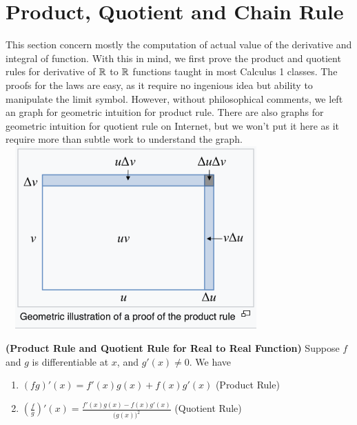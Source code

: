 \documentclass{report}
\begin{document}
\section{Product, Quotient and Chain Rule}
\begin{mdframed}
This section concern mostly the computation of actual value of the derivative and integral of function. With this in mind, we first prove the product and quotient rules for derivative of $\mathbb{R}$ to  $\mathbb{R}$ functions taught in most Calculus 1 classes. The proofs for the laws are easy, as it require no ingenious idea but ability to manipulate the limit symbol. However, without philosophical comments, we left an graph for geometric intuition for product rule. There are also graphs for geometric intuition for quotient rule on Internet, but we won't put it here as it require more than subtle work to understand the graph.    
\includegraphics[height=7cm,width=10cm]{product rule.png}
\end{mdframed}
\label{11}
\begin{theorem}
\textbf{(Product Rule and Quotient Rule for Real to Real Function)} Suppose $f$ and $g$ is differentiable at  $x$, and $g'(x)\neq 0$. We have 
\label{3}
\begin{enumerate}[label=(\alph*)]
  \item $(fg)'(x)=f'(x)g(x)+f(x)g'(x)$ (Product Rule)
  \item $(\frac{f}{g})'(x)=\frac{f'(x)g(x)-f(x)g'(x)}{\big(g(x) \big)^2}$ (Quotient Rule)
\end{enumerate}
\end{theorem}
\end{document}

